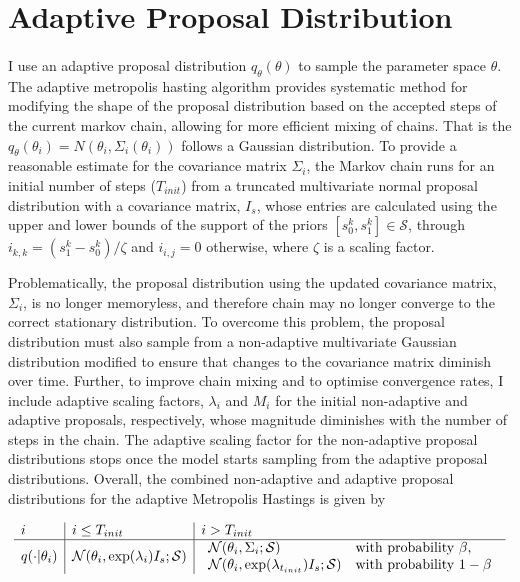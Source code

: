 
\section{Adaptive Proposal Distribution}

\paragraph{}I use an adaptive proposal distribution $q_\theta(\theta)$ to sample the parameter space $\theta$. The adaptive metropolis hasting algorithm provides systematic method for modifying the shape of the proposal distribution based on the accepted steps of the current markov chain, allowing for more efficient mixing of chains. That is the $q_\theta(\theta_i) = N(\theta_i, \Sigma_i(\theta_i))$ follows a Gaussian distribution. To provide a reasonable estimate for the covariance matrix $\Sigma_i$, the Markov chain runs for an initial number of steps ($T_{init}$) from a truncated multivariate normal proposal distribution with a covariance matrix, $I_s$, whose entries are calculated using the upper and lower bounds of the support of the priors $[s^k_0, s^k_1] \in \mathcal{S}$, through $i_{k,k} = (s^k_1 - s^k_0)/\zeta$ and $i_{i,j} = 0$ otherwise, where $\zeta$ is a scaling factor.
 
Problematically, the proposal distribution using the updated covariance matrix, $\Sigma_i$, is no longer memoryless, and therefore chain may no longer converge to the correct stationary distribution. To overcome this problem, the proposal distribution must also sample from a non-adaptive multivariate Gaussian distribution modified to ensure that changes to the covariance matrix diminish over time. Further, to improve chain mixing and to optimise convergence rates, I include adaptive scaling factors, $\lambda_i$ and $M_i$ for the initial non-adaptive and adaptive proposals, respectively, whose magnitude diminishes with the number of steps in the chain. The adaptive scaling factor for the non-adaptive proposal distributions stops once the model starts sampling from the adaptive proposal distributions. Overall, the combined non-adaptive and adaptive proposal distributions for the adaptive Metropolis Hastings is given by

\begin{equation}
\begin{array}{l | l | l}
\label{eq:proposal}

i & i \leq T_{init} & i > T_{init} \\ \hline
q(\cdot|\theta_i)&\mathcal{N}(\theta_i, \exp(\lambda_i)I_{s};\mathcal{S})  &


\begin{array}{ll}
\mathcal{N}(\theta_i, \Sigma_i;\mathcal{S}) & \text{with probability }\beta, \\
\mathcal{N}(\theta_i, \exp(\lambda_{t_{init}})I_{s};\mathcal{S}) & \text{with probability }1 - \beta \\ 
\end{array}
 \end{array}
 \end{equation}
 

